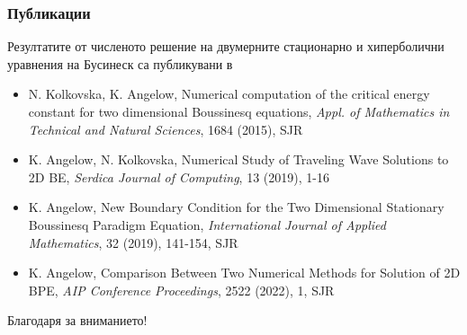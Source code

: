 \documentclass{beamer}
\begin{document}

\begin{frame}
\frametitle{Публикации}

Резултатите от численото решение на двумерните стационарно и хиперболични уравнения на Бусинеск са
публикувани в
\begin{itemize}
  \item N. Kolkovska, K. Angelow, Numerical computation of the critical energy constant for two dimensional Boussinesq equations, {\it Appl. of Mathematics in Technical and Natural Sciences}, 1684 (2015), SJR
  \item K. Angelow, N. Kolkovska, Numerical Study of Traveling Wave Solutions to 2D BE, {\it Serdica Journal of Computing}, 13 (2019), 1-16
  \item K. Angelow, New Boundary Condition for the Two Dimensional Stationary Boussinesq Paradigm Equation, {\it International Journal of Applied Mathematics}, 32 (2019), 141-154, SJR
   \item K. Angelow, Comparison Between Two Numerical Methods for Solution of 2D BPE, {\it AIP Conference Proceedings}, 2522 (2022), 1, SJR
\end{itemize}

\end{frame}


\begin{frame}


{\Large \center Благодаря за вниманието!}


\end{frame}
\end{document}

